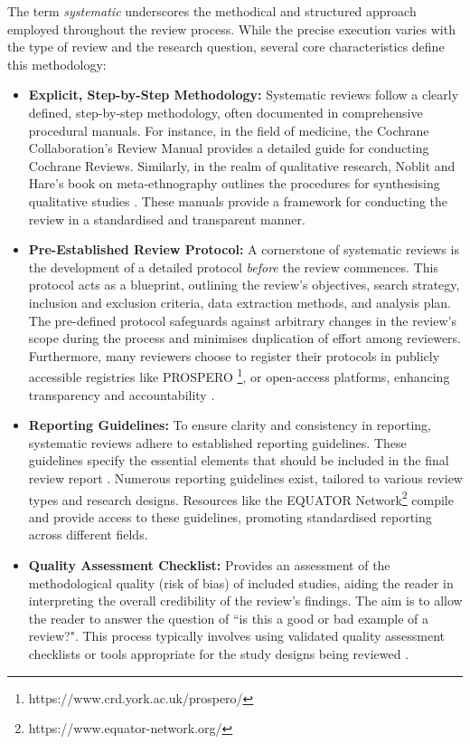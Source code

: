 \documentclass[10pt, english]{article}
\begin{document}
The term \emph{systematic} underscores the methodical and structured approach employed throughout the review process. While the precise execution varies with the type of review and the research question, several core characteristics define this methodology:

\begin{itemize}
    \item {\bf{Explicit, Step-by-Step Methodology:}} Systematic reviews follow a clearly defined, step-by-step methodology, often documented in comprehensive procedural manuals. For instance, in the field of medicine, the Cochrane Collaboration's Review Manual \cite{lefebvre2011cochrane} provides a detailed guide for conducting Cochrane Reviews. Similarly, in the realm of qualitative research, Noblit and Hare's book on meta-ethnography outlines the procedures for synthesising qualitative studies \cite{noblit_meta-ethnography_1988}. These manuals provide a framework for conducting the review in a standardised and transparent manner.
    \item {\bf{Pre-Established Review Protocol:}} A cornerstone of systematic reviews is the development of a detailed protocol {\it{before}} the review commences. This protocol acts as a blueprint, outlining the review's objectives, search strategy, inclusion and exclusion criteria, data extraction methods, and analysis plan. The pre-defined protocol safeguards against arbitrary changes in the review's scope during the process and minimises duplication of effort among reviewers. Furthermore, many reviewers choose to register their protocols in publicly accessible registries like PROSPERO \footnote{https://www.crd.york.ac.uk/prospero/}, or open-access platforms, enhancing transparency and accountability \cite{tawfik_protocol_2020}.
    \item {\bf{Reporting Guidelines:}} To ensure clarity and consistency in reporting, systematic reviews adhere to established reporting guidelines. These guidelines specify the essential elements that should be included in the final review report \cite{moher_preferred_2010}. Numerous reporting guidelines exist, tailored to various review types and research designs. Resources like the EQUATOR Network\footnote{https://www.equator-network.org/} compile and provide access to these guidelines, promoting standardised reporting across different fields.
    \item {\bf{Quality Assessment Checklist:}} Provides an assessment of the methodological quality (risk of bias) of included studies, aiding the reader in interpreting the overall credibility of the review’s findings. The aim is to allow the reader to answer the question of ``is this a good or bad example of a review?". This process typically involves using validated quality assessment checklists or tools appropriate for the study designs being reviewed \cite{whiting_proposed_2017}.

\end{itemize}
\end{document}
